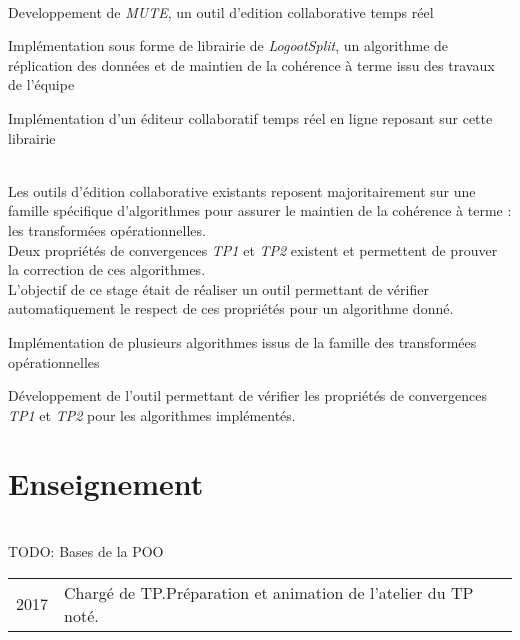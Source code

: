 \documentclass[]{deedy-resume-openfont}
\begin{document}
\\

Developpement de \emph{MUTE}, un outil d'edition collaborative temps réel
\begin{tightemize}
\item Implémentation sous forme de librairie de \emph{LogootSplit}, un algorithme de réplication des données et de maintien de la cohérence à terme issu des travaux de l'équipe
\item Implémentation d'un éditeur collaboratif temps réel en ligne reposant sur cette librairie
\end{tightemize}
\sectionsep

\\
Les outils d'édition collaborative existants reposent majoritairement sur une famille spécifique d'algorithmes
pour assurer le maintien de la cohérence à terme : les transformées opérationnelles.\\
Deux propriétés de convergences \emph{TP1} et \emph{TP2} existent et permettent de prouver la correction de ces algorithmes.\\
L'objectif de ce stage était de réaliser un outil permettant de vérifier automatiquement le respect de ces propriétés pour un algorithme donné.
\begin{tightemize}
\item Implémentation de plusieurs algorithmes issus de la famille des transformées opérationnelles
\item Développement de l'outil permettant de vérifier les propriétés de convergences \emph{TP1} et \emph{TP2} pour les algorithmes implémentés.
\end{tightemize}
\sectionsep


\section{Enseignement}

\\
TODO: Bases de la POO\\
\begin{tabular}{cp{125mm}}
2017            & Chargé de TP.\newline Préparation et animation de l'atelier du TP noté.
\end{tabular}
\sectionsep
\end{document}
